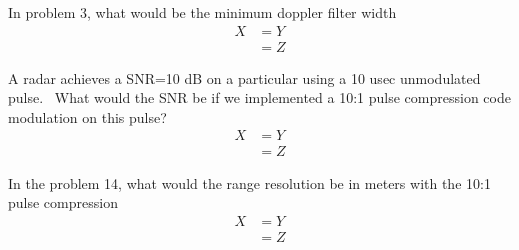 \documentclass[12pt]{article}
\newenvironment{exercise}[2][Exercise]{\begin{trivlist}
    \item[\hskip \labelsep {\bfseries #1}\hskip \labelsep {\bfseries #2.}]}{\end{trivlist}}
\begin{document}
      \begin{exercise}{13}
      In problem 3, what would be the minimum doppler filter width
      \begin{align*}
      X & = Y\\
      & = Z
      \end{align*}
      \end{exercise}
      
      \begin{exercise}{14}
      A radar achieves a SNR=10 dB on a particular using a 10 usec unmodulated pulse.  What would the SNR be if we implemented a 10:1 pulse compression code modulation on this pulse?  
      \begin{align*}
      X & = Y\\
      & = Z
      \end{align*}
      \end{exercise}
      
      \begin{exercise}{15}
      In the problem 14, what would the range resolution be in meters with the 10:1 pulse compression      
      \begin{align*}
      X & = Y\\
      & = Z
      \end{align*}
      \end{exercise}




      
	      
	       
	       
\end{document}
